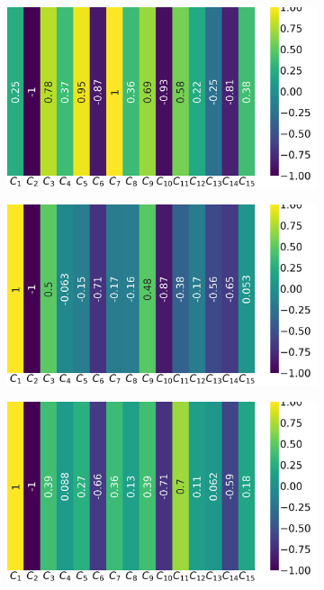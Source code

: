 \begin{figure}[!h]
	\centering
	\begin{subfigure}{0.49\linewidth}
		\includegraphics[width=\linewidth]{img/qlp_corr/Cnmod_coil0.png}
	\end{subfigure}
	\begin{subfigure}{0.49\linewidth}
		\includegraphics[width=\linewidth]{img/qlp_corr/Cnmod_coil1.png}
	\end{subfigure}
	\begin{subfigure}{0.49\linewidth}
		\includegraphics[width=\linewidth]{img/qlp_corr/Cnmod_coil2.png}

\end{subfigure}
\end{figure}
